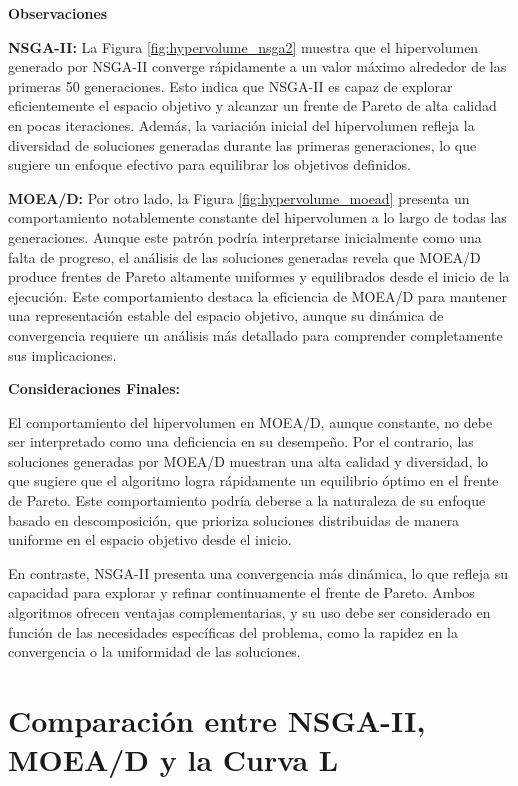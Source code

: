\textbf{Observaciones}

\textbf{NSGA-II:} La Figura \ref{fig:hypervolume_nsga2} muestra que el hipervolumen generado por NSGA-II converge rápidamente a un valor máximo alrededor de las primeras 50 generaciones. Esto indica que NSGA-II es capaz de explorar eficientemente el espacio objetivo y alcanzar un frente de Pareto de alta calidad en pocas iteraciones. Además, la variación inicial del hipervolumen refleja la diversidad de soluciones generadas durante las primeras generaciones, lo que sugiere un enfoque efectivo para equilibrar los objetivos definidos.

\textbf{MOEA/D:} Por otro lado, la Figura \ref{fig:hypervolume_moead} presenta un comportamiento notablemente constante del hipervolumen a lo largo de todas las generaciones. Aunque este patrón podría interpretarse inicialmente como una falta de progreso, el análisis de las soluciones generadas revela que MOEA/D produce frentes de Pareto altamente uniformes y equilibrados desde el inicio de la ejecución. Este comportamiento destaca la eficiencia de MOEA/D para mantener una representación estable del espacio objetivo, aunque su dinámica de convergencia requiere un análisis más detallado para comprender completamente sus implicaciones.

\textbf{Consideraciones Finales:}

El comportamiento del hipervolumen en MOEA/D, aunque constante, no debe ser interpretado como una deficiencia en su desempeño. Por el contrario, las soluciones generadas por MOEA/D muestran una alta calidad y diversidad, lo que sugiere que el algoritmo logra rápidamente un equilibrio óptimo en el frente de Pareto. Este comportamiento podría deberse a la naturaleza de su enfoque basado en descomposición, que prioriza soluciones distribuidas de manera uniforme en el espacio objetivo desde el inicio.

En contraste, NSGA-II presenta una convergencia más dinámica, lo que refleja su capacidad para explorar y refinar continuamente el frente de Pareto. Ambos algoritmos ofrecen ventajas complementarias, y su uso debe ser considerado en función de las necesidades específicas del problema, como la rapidez en la convergencia o la uniformidad de las soluciones.


\section{Comparación entre NSGA-II, MOEA/D y la Curva L} \label{sec:results:comparison}

